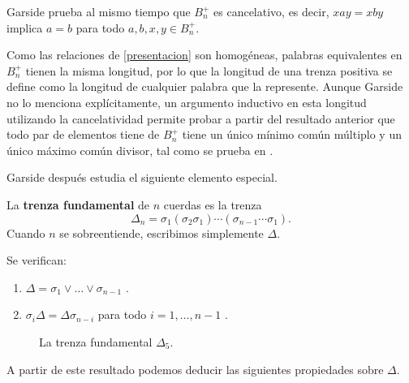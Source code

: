 \documentclass[bibtex, anon]{TEMat-article}
\begin{document}
Garside prueba al mismo tiempo que $B_n^+$ es cancelativo, es decir, $xay=xby$ implica $a=b$ para todo $a,b,x,y\in B_n^+$.

Como las relaciones de \ref{presentacion} son homogéneas, palabras equivalentes en $B_n^+$ tienen la misma longitud, por lo que la longitud de una trenza positiva se define como la longitud de cualquier palabra que la represente. Aunque Garside no lo menciona explícitamente, un argumento inductivo en esta longitud utilizando la cancelatividad permite probar a partir del resultado anterior que todo par de elementos tiene de $B_n^+$ tiene un único mínimo común múltiplo y un único máximo común divisor, tal como se prueba en \cite{Dehornoy}. 

Garside después estudia el siguiente elemento especial.
\begin{definicion}
	La \textbf{trenza fundamental} de $n$ cuerdas es la trenza
	$$\Delta_n=\sigma_1(\sigma_2\sigma_1)\cdots(\sigma_{n-1}\cdots\sigma_1).$$
	Cuando $n$ se sobreentiende, escribimos simplemente $\Delta$. 
\end{definicion} 


\begin{proposicion}\label{conjuga}
	Se verifican: 
	\begin{enumerate}
		\item $\Delta=\sigma_1\lor\dots\lor\sigma_{n-1}$ \cite[Lema 1]{Garside}.
		\item $\sigma_i\Delta=\Delta\sigma_{n-i}$ para todo $i=1,\dots, n-1$ \cite[Lema 4]{Garside}.
	\end{enumerate}
\end{proposicion} 


\begin{figure}[h!]
	\centering
	\caption{La trenza fundamental $\Delta_5$.}
\end{figure}


A partir de este resultado podemos deducir las siguientes propiedades sobre $\Delta$.
\end{document}
